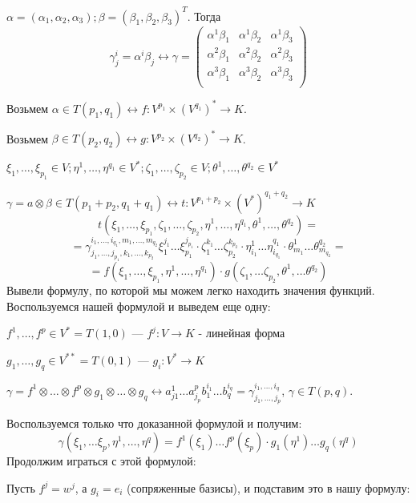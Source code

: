 $\alpha = (\alpha_1,\alpha_2,\alpha_3); \beta =(\beta_1,\beta_2,\beta_3)^T$. Тогда
$$\gamma^i_j =\alpha^i\beta_j \leftrightarrow \gamma = \begin{pmatrix}
    \alpha^1\beta_1 &\alpha^1\beta_2 & \alpha^1 \beta_3 \\
    \alpha^2\beta_1 &\alpha^2\beta_2 & \alpha^2 \beta_3 \\
     \alpha^3\beta_1 &\alpha^3\beta_2 & \alpha^3 \beta_3 \\
\end{pmatrix}$$



Возьмем $\alpha \in T(p_1,q_1) \leftrightarrow f: V^{p_1}\times(V^{q_1})^* \rightarrow K$.

Возьмем $\beta \in T(p_2,q_2) \leftrightarrow g: V^{p_2}\times(V^{q_2})^* \rightarrow K$.

$\xi_1,\ldots, \xi_{p_1} \in V;\eta^1,\ldots, \eta^{q_1}\in V^*;\zeta_1,\ldots, \zeta_{p_2}\in V; \theta^1,\ldots, \theta^{q_2}\in V^*$

$\gamma = a \otimes \beta \in T(p_1+p_2, q_1+q_1)\leftrightarrow t: V^{p_1+p_2}\times (V^*)^{q_1+q_2}\rightarrow K$
$$t(\xi_1,\ldots,\xi_{p_1},\zeta_1,\ldots,\zeta_{p_2}, \eta^1,\ldots, \eta^{q_1},\theta^1,\ldots, \theta^{q_2}) =$$$$= \gamma_{j_1,\ldots,j_{p_1},k_1,\ldots,k_{p_2}}^{i_1,\ldots,i_{q_1},m_1,\ldots,m_{q_2}} \xi_1^{j_1}\ldots \xi_{p_1}^{j_{p_1}}\cdot \zeta_1^{k_1}\ldots \zeta_{p_2}^{k_{p_2}} \cdot \eta^1_{i_1}\ldots \eta_{i_{q_1}}^{q_1} \cdot \theta_{m_1}^1 \ldots \theta^{q_2}_{m_{q_2}} = $$
$$=f(\xi_1,\ldots, \xi_{p_1},\eta^1,\ldots, \eta^{q_1})\cdot g(\zeta_1,\ldots \zeta_{p_2}, \theta^1,\ldots \theta^{q_2}) $$
Вывели формулу, по которой мы можем легко находить значения функций. Воспользуемся нашей формулой и выведем еще одну:

$f^1,\ldots , f^p \in V^* = T(1,0)$ --- $f^j:V\rightarrow K$  - линейная форма

$g_1,\ldots,g_q\in V^{**} = T(0,1)$ --- $g_i:V^*\rightarrow K$

$\gamma = f^1\otimes \ldots \otimes f^p \otimes g_1 \otimes \ldots \otimes g_q \leftrightarrow a^1_{j1}\ldots a^{p}_{j_p}b_1^{i_1}\ldots b_q^{i_q}= \gamma^{i_1,\ldots, i_q}_{j_1,\ldots, j_p}$, $\gamma \in T(p,q)$.

Воспользуемся только что доказанной формулой и получим:
$$\gamma(\xi_1,\ldots \xi_p, \eta^1,\ldots, \eta^q)= f^1(\xi_1)\ldots f^p(\xi_p)\cdot g_1(\eta^1)\ldots g_q(\eta^q)$$
Продолжим играться с этой формулой:

Пусть $f^j = w^j$, а $g_i = e_i$ (сопряженные базисы), и подставим это в нашу формулу:

